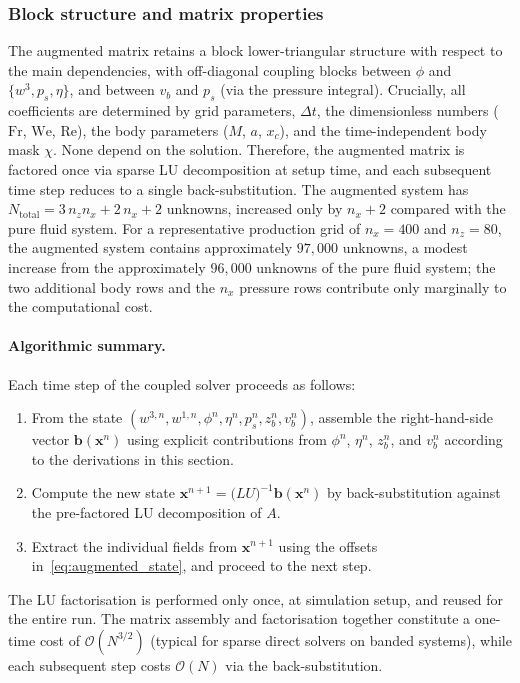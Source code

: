 \documentclass{article}
\newcommand{\Fr}{\mathrm{Fr}}
\newcommand{\We}{\mathrm{We}}
\newcommand{\Rey}{\mathrm{Re}}
\newcommand{\xx}{\mathbf{x}}
\newcommand{\bb}{\mathbf{b}}
\newcommand{\OO}{\mathcal{O}}
\begin{document}
\subsubsection{Block structure and matrix properties}

The augmented matrix retains a block lower-triangular structure with respect to the main dependencies, with off-diagonal coupling blocks between $\phi$ and $\{w^3, p_s, \eta\}$, and between $v_b$ and $p_s$ (via the pressure integral).
Crucially, all coefficients are determined by grid parameters, $\Delta t$, the dimensionless numbers ($\Fr$, $\We$, $\Rey$), the body parameters ($M$, $a$, $x_c$), and the time-independent body mask $\chi$.
None depend on the solution.
Therefore, the augmented matrix is factored once via sparse LU decomposition at setup time, and each subsequent time step reduces to a single back-substitution.
The augmented system has $N_{\mathrm{total}} = 3\,n_z n_x + 2\,n_x + 2$ unknowns, increased only by $n_x + 2$ compared with the pure fluid system.
For a representative production grid of $n_x = 400$ and $n_z = 80$, the augmented system contains approximately $97{,}000$ unknowns, a modest increase from the approximately $96{,}000$ unknowns of the pure fluid system; the two additional body rows and the $n_x$ pressure rows contribute only marginally to the computational cost.

\paragraph{Algorithmic summary.}
Each time step of the coupled solver proceeds as follows:
\begin{enumerate}
    \item From the state $(w^{3,n}, w^{1,n}, \phi^n, \eta^n, p_s^n, z_b^n, v_b^n)$, assemble the right-hand-side vector $\bb(\xx^n)$ using explicit contributions from $\phi^n$, $\eta^n$, $z_b^n$, and $v_b^n$ according to the derivations in this section.
    \item Compute the new state $\xx^{n+1} = \mathrm({LU})^{-1}\bb(\xx^n)$ by back-substitution against the pre-factored LU decomposition of $A$.
    \item Extract the individual fields from $\xx^{n+1}$ using the offsets in~\eqref{eq:augmented_state}, and proceed to the next step.
\end{enumerate}
The LU factorisation is performed only once, at simulation setup, and reused for the entire run.
The matrix assembly and factorisation together constitute a one-time cost of $\OO(N^{3/2})$ (typical for sparse direct solvers on banded systems), while each subsequent step costs $\OO(N)$ via the back-substitution.
\end{document}
